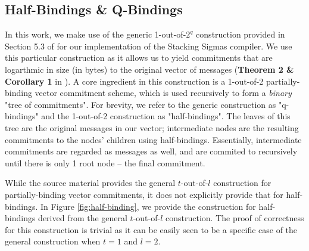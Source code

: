 \subsection{Half-Bindings \& Q-Bindings}\label{sec:qbinding}
In this work, we make use of the generic 1-out-of-$2^q$ construction provided in Section 5.3 of \cite{StackingSigmas} 
for our implementation of the Stacking Sigmas compiler. We use this 
particular construction as it allows us to yield commitments that are logarthmic in size (in bytes) to the original 
vector of messages (\textbf{Theorem 2 \& Corollary 1} in \cite{StackingSigmas}).
A core ingredient in this construction is a 1-out-of-2 partially-binding vector commitment scheme, which is used recursively 
to form a \textit{binary} "tree of commitments". 
For brevity, we refer to the generic construction as "q-bindings" and the 1-out-of-2 construction as "half-bindings".
The leaves of this tree are the original messages in our vector; intermediate nodes are the resulting commitments to the 
nodes' children using half-bindings. 
Essentially, intermediate commitments are regarded as messages as well, and are commited to recursively until there is only 
1 root node -- the final commitment. 

While the source material provides the general $t$-out-of-$l$ construction for partially-binding vector commitments, 
it does not explicitly provide that for half-bindings. 
In Figure \ref{fig:half-binding}, we provide the construction for half-bindings derived from the general $t$-out-of-$l$ 
construction. 
The proof of correctness for this construction is trivial as it can be easily seen to be a specific case of the general 
construction when $t = 1$ and $l = 2$. 

